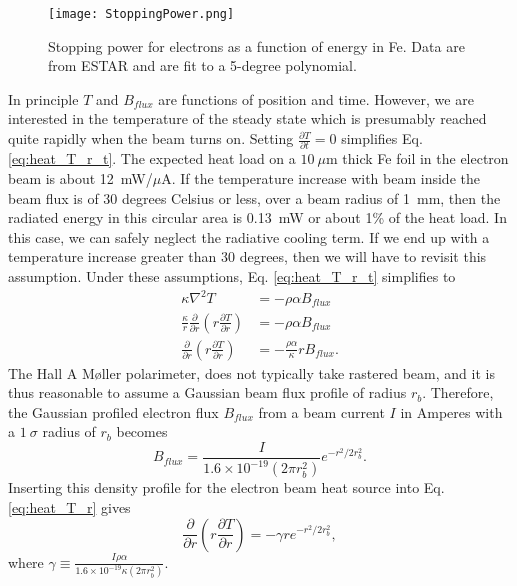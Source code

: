 \documentclass[12pt]{article}
\begin{document}
\begin{figure}[h]
\centering
\texttt{[image: StoppingPower.png]}
\caption{\label{fig:stopping}Stopping power for electrons as a function of energy in Fe. Data are from ESTAR and are fit to a 5-degree polynomial.}
\end{figure}
In principle $T$ and $B_{flux}$ are functions of position and time. However, we are interested in the temperature of the steady state which is presumably reached quite rapidly when the beam turns on. Setting $\frac{\partial T}{\partial t}=0$ simplifies Eq. \ref{eq:heat_T_r_t}. The expected heat load on a $10~\mu$m thick Fe foil in the electron beam is about 12~mW/$\mu$A. If the temperature increase with beam inside the beam flux is of 30 degrees Celsius or less, over a beam radius of 1~mm, then the radiated energy in this circular area is 0.13~mW or about 1\% of the heat load. In this case, we can safely neglect the radiative cooling term. If we end up with a temperature increase greater than 30 degrees, then we will have to revisit this assumption. Under these assumptions, Eq. \ref{eq:heat_T_r_t} simplifies to  
\begin{align}
\kappa\nabla^2T&=-\rho\alpha B_{flux}\\
\frac{\kappa}{r}\frac{\partial}{\partial r}\left(r\frac{\partial T}{\partial r}\right)&=-\rho\alpha B_{flux}\\
\label{eq:heat_T_r}
\frac{\partial}{\partial r}\left(r\frac{\partial T}{\partial r}\right)&=-\frac{\rho\alpha}{\kappa}rB_{flux}.
\end{align}
The Hall A M\o ller polarimeter, does not typically take rastered beam, and it is thus reasonable to assume a Gaussian beam flux profile of radius $r_b$. Therefore, the Gaussian profiled electron flux $B_{flux}$ from a beam current $I$ in Amperes with a $1~\sigma$ radius of $r_{b}$ becomes
\begin{equation}
B_{flux}=\frac{I}{1.6\times 10^{-19} \left(2\pi r_{b}^2\right)}e^{-r^2/2r_b^2}.
\end{equation}
Inserting this density profile for the electron beam heat source into Eq. \ref{eq:heat_T_r} gives
\begin{equation}
\label{eq:heat_Tr_simp}
\frac{\partial}{\partial r}\left(r\frac{\partial T}{\partial r}\right)=-\gamma re^{-r^2/2r_b^2},
\end{equation} 
where $\gamma\equiv\frac{I\rho\alpha}{1.6\times 10^{-19} \kappa\left(2\pi r_{b}^2\right)}$.
\end{document}
